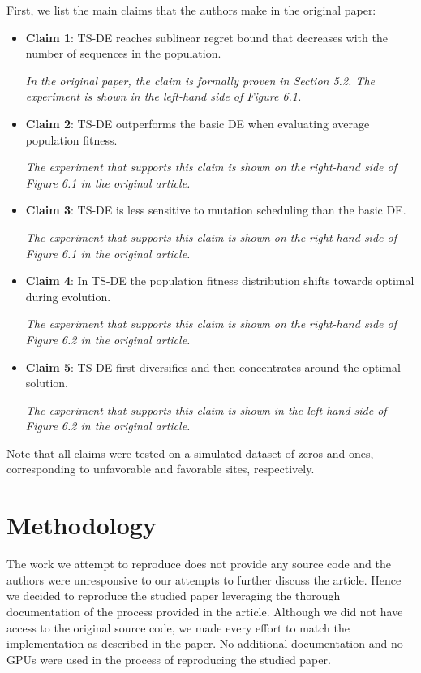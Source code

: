 First, we list the main claims that the authors make in the original paper:
\begin{itemize}
    \item \textbf{Claim 1}: TS-DE reaches sublinear regret bound that decreases with the number of sequences in the population. 
    
    \textit{In the original paper, the claim is formally proven in Section 5.2. The experiment is shown in the left-hand side of Figure 6.1.}
    \item \textbf{Claim 2}: TS-DE outperforms the basic DE when evaluating average population fitness. 
    
    \textit{The experiment that supports this claim is shown on the right-hand side of Figure 6.1 in the original article.}
    \item \textbf{Claim 3}: TS-DE is less sensitive to mutation scheduling than the basic DE. 
    
    \textit{The experiment that supports this claim is shown on the right-hand side of Figure 6.1 in the original article.}
    \item \textbf{Claim 4}: In TS-DE the population fitness distribution shifts towards optimal during evolution. 
    
    \textit{The experiment that supports this claim is shown on the right-hand side of Figure 6.2 in the original article.}
    \item \textbf{Claim 5}: TS-DE first diversifies and then concentrates around the optimal solution. 
    
    \textit{The experiment that supports this claim is shown in the left-hand side of Figure 6.2 in the original article.}
\end{itemize}
Note that all claims were tested on a simulated dataset of zeros and ones, corresponding to unfavorable and favorable sites, respectively.


\section{Methodology}
The work we attempt to reproduce does not provide any source code and the authors were unresponsive to our attempts to further discuss the article. Hence we decided to reproduce the studied paper leveraging the thorough documentation of the process provided in the article. Although we did not have access to the original source code, we made every effort to match the implementation as described in the paper. No additional documentation and no GPUs were used in the process of reproducing the studied paper. 

